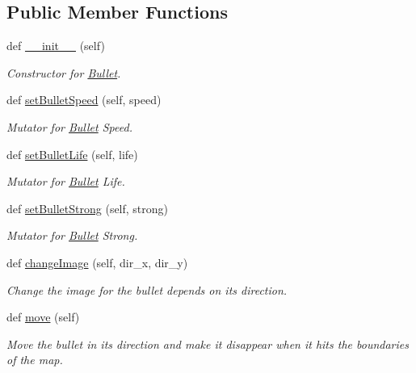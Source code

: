 \subsection*{Public Member Functions}
\begin{DoxyCompactItemize}
\item 
def \mbox{\hyperlink{classbullet_1_1_bullet_a1c93c82a0a9c18dd9513e1ee5838d50b}{\+\_\+\+\_\+init\+\_\+\+\_\+}} (self)
\begin{DoxyCompactList}\small\item\em Constructor for \mbox{\hyperlink{classbullet_1_1_bullet}{Bullet}}. \end{DoxyCompactList}\item 
def \mbox{\hyperlink{classbullet_1_1_bullet_a6aa6749c184160cf33aaa7af4ea62ef1}{set\+Bullet\+Speed}} (self, speed)
\begin{DoxyCompactList}\small\item\em Mutator for \mbox{\hyperlink{classbullet_1_1_bullet}{Bullet}} Speed. \end{DoxyCompactList}\item 
def \mbox{\hyperlink{classbullet_1_1_bullet_a71d9760cab8d3e819772b17a6878518a}{set\+Bullet\+Life}} (self, life)
\begin{DoxyCompactList}\small\item\em Mutator for \mbox{\hyperlink{classbullet_1_1_bullet}{Bullet}} Life. \end{DoxyCompactList}\item 
def \mbox{\hyperlink{classbullet_1_1_bullet_ab6e99051563698d883e2f8f8c003e949}{set\+Bullet\+Strong}} (self, strong)
\begin{DoxyCompactList}\small\item\em Mutator for \mbox{\hyperlink{classbullet_1_1_bullet}{Bullet}} Strong. \end{DoxyCompactList}\item 
def \mbox{\hyperlink{classbullet_1_1_bullet_ab263dc8a2f65deb49402c585b01ba0fd}{change\+Image}} (self, dir\+\_\+x, dir\+\_\+y)
\begin{DoxyCompactList}\small\item\em Change the image for the bullet depends on its direction. \end{DoxyCompactList}\item 
def \mbox{\hyperlink{classbullet_1_1_bullet_a9e9ce6492e67df70a832981990f88eeb}{move}} (self)
\begin{DoxyCompactList}\small\item\em Move the bullet in its direction and make it disappear when it hits the boundaries of the map. \end{DoxyCompactList}\end{DoxyCompactItemize}
